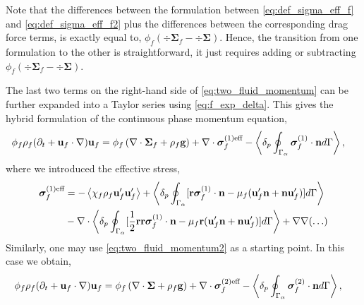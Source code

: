 Note that the differences between the formulation between \ref{eq:def_sigma_eff_f} and \ref{eq:def_sigma_eff_f2}  plus the differences between the corresponding drag force terms, is exactly equal to, $\phi_f (\div \bm\Sigma_f - \div\bm\Sigma)$.
Hence, the transition from one formulation to the other is straightforward, it just requires adding or subtracting $\phi_f (\div \bm\Sigma_f - \div\bm\Sigma)$. 


The last two terms on the right-hand side of \ref{eq:two_fluid_momentum} can be further expanded into a Taylor series using \ref{eq:f_exp_delta}. 
This gives the hybrid formulation of the continuous phase momentum equation,
\begin{align}
    \phi_f \rho_f(\pddt + \textbf{u}_f  \cdot \grad) \textbf{u}_f
    &= \phi_f 
    \left(\div \bm{\Sigma}_f
    + \rho_f \textbf{g}\right)
    + \div \bm\sigma_f^{(1)\text{eff}}
    - \pSavg{\bm\sigma_f^{(1)}\cdot \textbf{n}}, 
    \label{eq:dt_uf}
\end{align}
where we introduced the effective stress, 
\begin{align}
    \bm{\sigma}^{(1)\text{eff}}_f 
    &= 
    - \avg{\chi_f\rho_f \textbf{u}_f'\textbf{u}_f'} 
    + \pSavg{[\textbf{r}\bm\sigma^{(1)}_f\cdot \textbf{n} - \mu_f (\textbf{u}_f' \textbf{n} + \textbf{n} \textbf{u}_f')]}\nonumber\\
    &- \div
        \pSavg{[\frac{1}{2}\textbf{rr}\bm\sigma^{(1)}_f\cdot \textbf{n}- \mu_f\textbf{r} (\textbf{u}_f' \textbf{n} + \textbf{n} \textbf{u}_f')]}
        + \grad\grad (\ldots)
    \label{eq:def_sigma_eff_f}
\end{align}
Similarly, one may use \ref{eq:two_fluid_momentum2} as a starting point.
In this case we obtain, %
\begin{align}
    \phi_f \rho_f(\pddt + \textbf{u}_f  \cdot \grad) \textbf{u}_f
    &= \phi_f 
    \left(\div \bm{\Sigma}
    + \rho_f \textbf{g}\right)
    + \div \bm\sigma_f^{(2)\text{eff}}
    - \pSavg{\bm\sigma_f^{(2)}\cdot \textbf{n}}, 
    \label{eq:dt_uf2}
\end{align}
